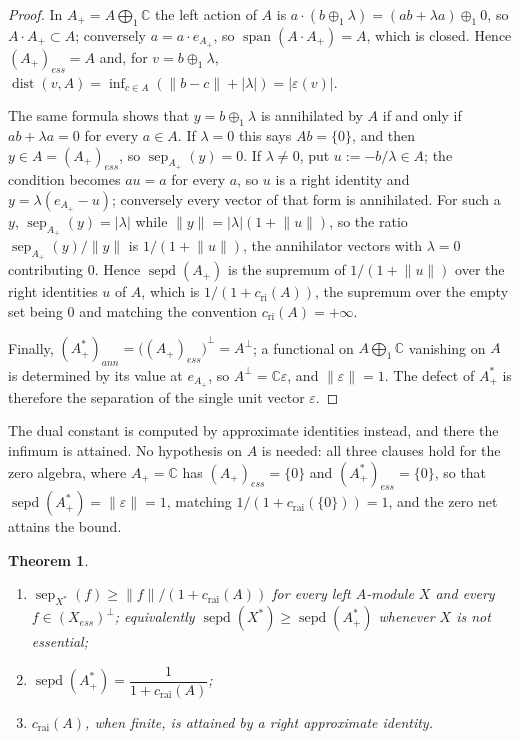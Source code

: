 \documentclass[11pt]{article}
\theoremstyle{plain}
\newtheorem{theorem}{Theorem}[section]
\theoremstyle{definition}
\DeclareMathOperator{\dist}{dist}
\DeclareMathOperator{\sep}{sep}
\DeclareMathOperator{\sepd}{sepd}
\newcommand{\cri}{c_{\mathrm{ri}}}
\newcommand{\crai}{c_{\mathrm{rai}}}
\begin{document}
\begin{proof}
In $A_+=A\bigoplus_1\mathbb{C}$ the left action of $A$ is
$a\cdot(b\oplus_1\lambda)=(ab+\lambda a)\oplus_1 0$, so
$A\cdot A_+\subset A$; conversely $a=a\cdot e_{A_+}$, so
$\operatorname{span}(A\cdot A_+)=A$, which is closed. Hence
${(A_+)}_{ess}=A$ and, for $v=b\oplus_1\lambda$,
$\dist(v,A)=\inf_{c\in A}(\lVert b-c\rVert+|\lambda|)=|\varepsilon(v)|$.

The same formula shows that $y=b\oplus_1\lambda$ is annihilated by $A$ if and
only if $ab+\lambda a=0$ for every $a\in A$. If $\lambda=0$ this says
$Ab= \{0 \}$, and then $y\in A={(A_+)}_{ess}$, so $\sep_{A_+}(y)=0$. If
$\lambda\neq 0$, put $u:=-b/\lambda\in A$; the condition becomes $au=a$ for every
$a$, so $u$ is a right identity and $y=\lambda(e_{A_+}-u)$; conversely every
vector of that form is annihilated. For such a $y$,
$\sep_{A_+}(y)=|\lambda|$ while
$\lVert y\rVert=|\lambda|(1+\lVert u\rVert)$, so the ratio
$\sep_{A_+}(y)/\lVert y\rVert$ is $1/(1+\lVert u\rVert)$, the annihilator vectors
with $\lambda=0$ contributing $0$. Hence $\sepd(A_+)$ is the supremum of
$1/(1+\lVert u\rVert)$ over the right identities $u$ of $A$, which is
$1/(1+\cri(A))$, the supremum over the empty set being $0$ and matching the
convention $\cri(A)=+\infty$.

Finally, ${(A_+^*)}_{ann}={\bigl({(A_+)}_{ess}\bigr)}^\perp=A^\perp$; a
functional on $A\bigoplus_1\mathbb{C}$ vanishing on $A$ is determined by its
value at $e_{A_+}$, so $A^\perp=\mathbb{C}\varepsilon$, and
$\lVert\varepsilon\rVert=1$. The defect of $A_+^*$ is therefore the separation of
the single unit vector $\varepsilon$.
\end{proof}

The dual constant is computed by approximate identities instead, and there the
infimum is attained. No hypothesis on $A$ is needed: all three clauses hold for
the zero algebra, where $A_+=\mathbb{C}$ has ${(A_+)}_{ess}= \{0 \}$ and
${(A_+^*)}_{ess}= \{0 \}$, so that $\sepd(A_+^*)=\lVert\varepsilon\rVert=1$,
matching $1/(1+\crai( \{0 \}))=1$, and the zero net attains the bound.

\begin{theorem}\label{SepOfDualUnitization}
\begin{enumerate}[label = (\roman*)]
\item $\sep_{X^*}(f)\geq\lVert f\rVert/(1+\crai(A))$ for every left $A$-module
$X$ and every $f\in{(X_{ess})}^\perp$; equivalently
$\sepd(X^*)\geq\sepd(A_+^*)$ whenever $X$ is not essential;

\item $\sepd(A_+^*)=\dfrac{1}{1+\crai(A)}$;

\item $\crai(A)$, when finite, is attained by a right approximate identity.
\end{enumerate}
\end{theorem}
\end{document}
